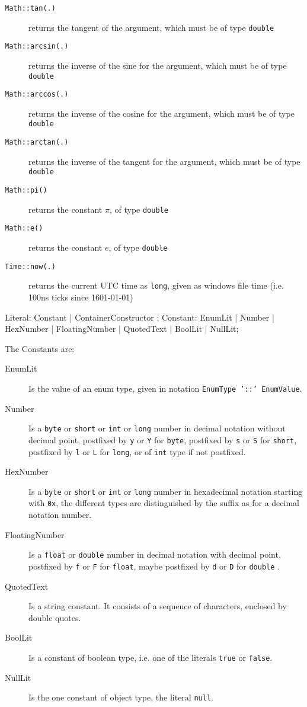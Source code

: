 \begin{description}
\item[\texttt{Math::tan(.)}] returns the tangent of the argument, which must be of type \texttt{double}
\item[\texttt{Math::arcsin(.)}] returns the inverse of the sine for the argument, which must be of type \texttt{double}
\item[\texttt{Math::arccos(.)}] returns the inverse of the cosine for the argument, which must be of type \texttt{double}
\item[\texttt{Math::arctan(.)}] returns the inverse of the tangent for the argument, which must be of type \texttt{double}
\item[\texttt{Math::pi()}] returns the constant $\pi$, of type \texttt{double}
\item[\texttt{Math::e()}] returns the constant $e$, of type \texttt{double}
\end{description}

\begin{description}
\item[\texttt{Time::now(.)}] returns the current UTC time as \texttt{long}, given as windows file time (i.e. 100ns ticks since 1601-01-01)
\end{description}

\begin{rail}
  Literal: Constant | ContainerConstructor ;
  Constant: EnumLit | Number | HexNumber | FloatingNumber | QuotedText | BoolLit | NullLit;
\end{rail}\label{literaldef}

\pagebreak %

The Constants are:
\begin{description}
  \item[EnumLit] Is the value of an enum type, given in notation \texttt{EnumType '::' EnumValue}.
  \item[Number] Is a \texttt{byte} or \texttt{short} or \texttt{int} or \texttt{long} number in decimal notation without decimal point, postfixed by \texttt{y} or \texttt{Y} for \texttt{byte}, postfixed by \texttt{s} or \texttt{S} for \texttt{short}, postfixed by \texttt{l} or \texttt{L} for \texttt{long}, or of \texttt{int} type if not postfixed.
  \item[HexNumber] Is a \texttt{byte} or \texttt{short} or \texttt{int} or \texttt{long} number in hexadecimal notation starting with \texttt{0x}, the different types are distinguished by the suffix as for a decimal notation number.
  \item[FloatingNumber] Is a \texttt{float} or \texttt{double} number in decimal notation with decimal point, postfixed by \texttt{f} or \texttt{F} for \texttt{float}, maybe postfixed by \texttt{d} or \texttt{D} for \texttt{double} .
  \item[QuotedText] Is a string constant. It consists of a sequence of characters, enclosed by double quotes.
  \item[BoolLit] Is a constant of boolean type, i.e. one of the literals \texttt{true} or \texttt{false}.
  \item[NullLit] Is the one constant of object type, the literal \texttt{null}.
\end{description}


